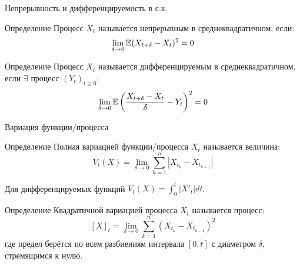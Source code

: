 \documentclass{beamer}
\begin{document}
\begin{frame}{Непрерывность и дифференцируемость в с.к.}
    \begin{block}{Определение}
        Процесс $X_t$ называется непрерывным в среднеквадратичном, если:
        $$
            \lim_{\delta \to 0} \mathbb{E}(X_{t+\delta} - X_t)^2 = 0
        $$
    \end{block}
    \begin{block}{Определение}
        Процесс $X_t$ называется дифференцируемым в среднеквадратичном, если $\exists$ процесс $(Y_t)_{t\geq 0}$:
        $$
            \lim_{\delta \to 0} \mathbb{E} \left(\dfrac{X_{t+\delta} - X_t}{\delta} - Y_t\right)^2 = 0
        $$
    \end{block}
\end{frame}

\begin{frame}{Вариация функции/процесса}
    \begin{block}{Определение}
        Полная вариацией функции/процесса $X_t$ называется величина:
        $$
            V_t(X) = \lim_{\delta \to 0} \sum_{k=1}^n |X_{t_k} - X_{t_{k-1}}|
        $$
    \end{block} Для дифференцируемых функций $V_t(X)=\int_0^t |X'_t|dt$. 
    \begin{block}{Определение}
        Квадратичной вариацией процесса $X_t$ называется процесс:
        $$
            [X]_t = \lim_{\delta \to 0} \sum_{k=1}^n (X_{t_k} - X_{t_{k-1}})^2
        $$где предел берётся по всем разбиениям интервала $[0, t]$ с диаметром $\delta$, стремящимся к нулю.
    \end{block}
\end{frame}
\end{document}
